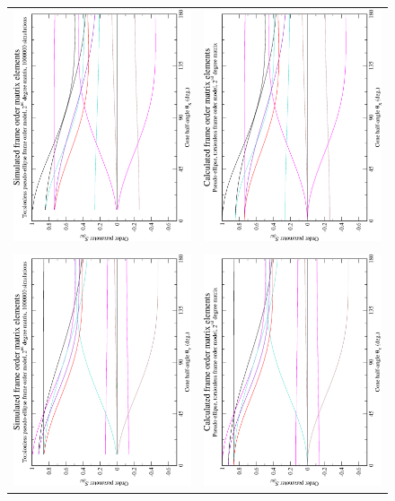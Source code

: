 \begin{figure}
\centering
  \begin{tabular}{@{}cc@{}}
    \includegraphics[width=.35\textwidth,angle=270]{images/frame_order_matrix/Sijkl_pseudo-ellipse_torsionless_in_frame_theta_x_ens1000000.eps} &
    \includegraphics[width=.35\textwidth,angle=270]{images/frame_order_matrix/Sijkl_pseudo-ellipse_torsionless_in_frame_theta_x_calc.eps} \\
    \\[-5pt]
    \includegraphics[width=.35\textwidth,angle=270]{images/frame_order_matrix/Sijkl_pseudo-ellipse_torsionless_in_frame_theta_y_ens1000000.eps} &
    \includegraphics[width=.35\textwidth,angle=270]{images/frame_order_matrix/Sijkl_pseudo-ellipse_torsionless_in_frame_theta_y_calc.eps} \\

\end{tabular}
\end{figure}
